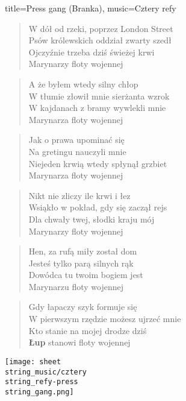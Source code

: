\newpage
\begin{song}{title={Press gang (Branka)}, music={Cztery refy}}
\begin{multicols}{2}
    \begin{verse}
        W dół od rzeki, poprzez London Street \\
        Psów królewskich oddział zwarty szedł \\
        Ojczyźnie trzeba dziś świeżej krwi \\
        Marynarzy floty wojennej
    \end{verse}
    \begin{verse}
        A że byłem wtedy silny chłop\\
        W tłumie złowił mnie sierżanta wzrok \\
        W kajdanach z bramy wywlekli mnie \\
        Marynarza floty wojennej
    \end{verse}
    \begin{verse}
        Jak o prawa upominać się \\
        Na gretingu nauczyli mnie \\
        Niejeden krwią wtedy spłynął grzbiet \\
        Marynarza floty wojennej
    \end{verse}
    \begin{verse}
        Nikt nie zliczy ile krwi i łez \\
        Wsiąkło w pokład, gdy się zaczął rejs \\
        Dla chwały twej, słodki kraju mój \\
        Marynarzy floty wojennej
    \end{verse}
    \begin{verse}
        Hen, za rufą miły został dom \\
        Jesteś tylko parą silnych rąk \\
        Dowódca tu twoim bogiem jest \\
        Marynarzu floty wojennej
    \end{verse}
    \begin{verse}
        Gdy łapaczy szyk formuje się \\
        W pierwszym rzędzie możesz ujrzeć mnie \\
        Kto stanie na mojej drodze dziś \\
        \textbf{Łup} stanowi floty wojennej
    \end{verse}
\end{multicols}
    \texttt{[image: sheet\\string\_music/cztery\\string\_refy-press\\string\_gang.png]}
\end{song}

